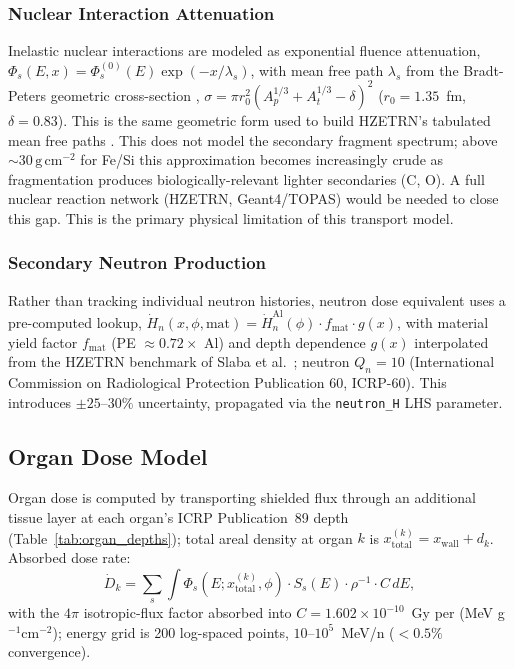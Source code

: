 \documentclass[a4paper,fleqn]{cas-sc}
\newcommand{\gcm}{\,\mathrm{g\,cm^{-2}}}
\newcommand{\code}[1]{\texttt{#1}}
\begin{document}
\subsubsection{Nuclear Interaction Attenuation}

Inelastic nuclear interactions are modeled as exponential fluence
attenuation, $\Phi_s(E,x)=\Phi_s^{(0)}(E)\exp(-x/\lambda_s)$, with mean
free path $\lambda_s$ from the Bradt-Peters geometric cross-section
\citep{bradtpeters1950}, $\sigma=\pi r_0^2(A_p^{1/3}+A_t^{1/3}-\delta)^2$
($r_0=1.35$~fm, $\delta=0.83$). This is the same geometric form used to build
HZETRN's tabulated mean free paths \citep{wilson1991}. This does not model
the secondary fragment spectrum; above $\sim\!30\gcm$ for Fe/Si this
approximation becomes increasingly crude as fragmentation produces
biologically-relevant lighter secondaries (C, O). A full nuclear reaction
network (HZETRN, Geant4/TOPAS) would be needed to close this gap. This is the
primary physical limitation of this transport model.

\subsubsection{Secondary Neutron Production}

Rather than tracking individual neutron histories, neutron dose equivalent
uses a pre-computed lookup, $\dot{H}_n(x,\phi,\mathrm{mat}) =
\dot{H}_n^\mathrm{Al}(\phi)\cdot f_\mathrm{mat}\cdot g(x)$, with material
yield factor $f_\mathrm{mat}$ (PE $\approx 0.72\times$ Al) and depth
dependence $g(x)$ interpolated from the HZETRN benchmark of Slaba et al.\
\cite{slaba2014}; neutron $Q_n=10$ (International Commission on
Radiological Protection Publication 60, ICRP-60). This introduces
$\pm25$--$30\%$ uncertainty, propagated via the \code{neutron\_H} LHS
parameter.

\subsection{Organ Dose Model}

Organ dose is computed by transporting shielded flux through an additional
tissue layer at each organ's ICRP Publication~89 depth \citep{icrp89}
(Table~\ref{tab:organ_depths}); total areal density at organ $k$ is
$x_\mathrm{total}^{(k)} = x_\mathrm{wall}+d_k$. Absorbed dose rate:
\begin{equation}
  \dot{D}_k = \sum_s \int \Phi_s(E; x_\mathrm{total}^{(k)},\phi)\cdot S_s(E)\cdot\rho^{-1}\cdot C\,dE,
\end{equation}
with the $4\pi$ isotropic-flux factor absorbed into $C=1.602\times10^{-10}$~Gy
per (MeV g$^{-1}$cm$^{-2}$); energy grid is 200 log-spaced points,
$10$--$10^5$~MeV/n ($<0.5\%$ convergence).
\end{document}
